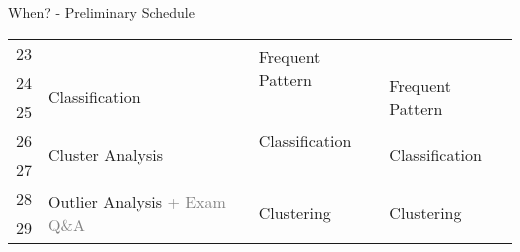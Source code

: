 \begin{frame}{When? - Preliminary Schedule}
\begin{tabular}{|p{4em}|p{15em}|p{9.5em}|p{9.5em}|p{10em}|}
		\cellcolor{faugray!25}23                    &                                                                   & \multicolumn{2}{|l|}{\multirow{2}{*}{Frequent Pattern}}                         & \cellcolor{gray!50}                                                      \\ \hhline{|-|-|~|~|-|}
		\cellcolor{faugray!25}24                    & \multirow{2}{*}{Classification}                                   & \multicolumn{2}{|l|}{}                                                          & \multirow{2}{*}{\cellcolor{white}Frequent Pattern}                       \\ \hhline{|-|~|-|-|~|}
		\cellcolor{faugray!25}25                    &                                                                   & \multicolumn{2}{|l|}{\multirow{3}{*}{Classification}}                           &                                                                          \\ \hhline{|-|-|~|~|-|}
		\cellcolor{faugray!25}26                    & \multirow{2}{*}{Cluster Analysis}                                 & \multicolumn{2}{|l|}{}                                                          & \multirow{2}{*}{\cellcolor{white}Classification}                         \\ \hhline{|-|~|~|~|~|}
		\cellcolor{faugray!25}27                    &                                                                   & \multicolumn{2}{|l|}{}                                                          &                                                                          \\ \hline
		\cellcolor{faugray!25}28                    & \multirow{2}{*}{Outlier Analysis \textcolor{gray}{+ Exam Q\&A }}  & \multicolumn{2}{|l|}{\multirow{2}{*}{Clustering}}                               & \multirow{2}{*}{\cellcolor{white}Clustering}                             \\ \hhline{|-|~|~|~|~|}
		\cellcolor{faugray!25}29                    &                                                                   & \multicolumn{2}{|l|}{}                                                          &                                                                          \\ \hline
	\end{tabular}

\end{frame}

